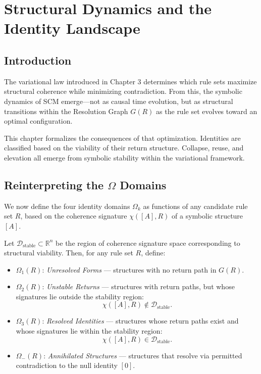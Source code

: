 \chapter{Structural Dynamics and the Identity Landscape}

\section*{Introduction}

The variational law introduced in Chapter 3 determines which rule sets maximize structural coherence while minimizing contradiction. From this, the symbolic dynamics of SCM emerge—not as causal time evolution, but as structural transitions within the Resolution Graph $G(R)$ as the rule set evolves toward an optimal configuration.

This chapter formalizes the consequences of that optimization. Identities are classified based on the viability of their return structure. Collapse, reuse, and elevation all emerge from symbolic stability within the variational framework.

\section{Reinterpreting the $\Omega$ Domains}

We now define the four identity domains $\Omega_k$ as functions of any candidate rule set $R$, based on the coherence signature $\chi([A], R)$ of a symbolic structure $[A]$.

\begin{definition}
Let $\mathcal{D}_{\text{stable}} \subset \mathbb{R}^n$ be the region of coherence signature space corresponding to structural viability. Then, for any rule set $R$, define:

\begin{itemize}
    \item $\Omega_1(R)$: \emph{Unresolved Forms} — structures with no return path in $G(R)$.
    \item $\Omega_2(R)$: \emph{Unstable Returns} — structures with return paths, but whose signatures lie outside the stability region:
    \[
    \chi([A], R) \notin \mathcal{D}_{\text{stable}}.
    \]
    \item $\Omega_3(R)$: \emph{Resolved Identities} — structures whose return paths exist and whose signatures lie within the stability region:
    \[
    \chi([A], R) \in \mathcal{D}_{\text{stable}}.
    \]
    \item $\Omega_{-}(R)$: \emph{Annihilated Structures} — structures that resolve via permitted contradiction to the null identity $[0]$.
\end{itemize}
\end{definition}

